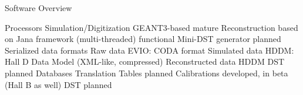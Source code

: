 Software Overview


\I Processors
   \I Simulation/Digitization
      \I GEANT3-based
      \I mature
   \I Reconstruction
      \I based on Jana framework (multi-threaded)
      \I functional
   \I Mini-DST generator
      \I planned
\I Serialized data formats
   \I Raw data
      \I EVIO: CODA format
   \I Simulated data
      \I HDDM: Hall D Data Model (XML-like, compressed)
   \I Reconstructed data
      \I HDDM
   \I DST
      \I planned
\I Databases
   \I Translation Tables
      \I planned
   \I Calibrations
      \I developed, in beta (Hall B as well)
   \I DST
      \I planned












